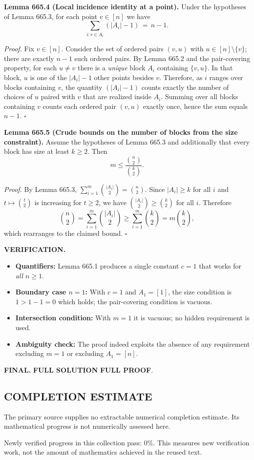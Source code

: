 \medskip
\noindent\textbf{Lemma 665.4 (Local incidence identity at a point).}
Under the hypotheses of Lemma 665.3, for each point $v\in[n]$ we have
\[
\sum_{i: v\in A_i} (|A_i|-1) \,=\, n-1.
\]

\noindent\emph{Proof.}
Fix $v\in[n]$.
Consider the set of ordered pairs $(v,u)$ with $u\in[n]\setminus\{v\}$; there are exactly $n-1$ such ordered pairs.
By Lemma 665.2 and the pair-covering property, for each $u\ne v$ there is a \emph{unique} block $A_i$ containing $\{v,u\}$.
In that block, $u$ is one of the $|A_i|-1$ other points besides $v$.
Therefore, as $i$ ranges over blocks containing $v$, the quantity $(|A_i|-1)$ counts exactly the number of choices of $u$ paired with $v$ that are realized inside $A_i$.
Summing over all blocks containing $v$ counts each ordered pair $(v,u)$ exactly once, hence the sum equals $n-1$.
\hfill$\square$

\medskip
\noindent\textbf{Lemma 665.5 (Crude bounds on the number of blocks from the size constraint).}
Assume the hypotheses of Lemma 665.3 and additionally that every block has size at least $k\ge 2$.
Then
\[
 m \le \frac{\binom n2}{\binom k2}.
\]

\noindent\emph{Proof.}
By Lemma 665.3, $\sum_{i=1}^m \binom{|A_i|}{2} = \binom n2$.
Since $|A_i|\ge k$ for all $i$ and $t\mapsto \binom t2$ is increasing for $t\ge 2$, we have $\binom{|A_i|}{2}\ge \binom k2$ for all $i$.
Therefore
\[
\binom n2 
= \sum_{i=1}^m \binom{|A_i|}{2}
\ge \sum_{i=1}^m \binom k2
= m\binom k2,
\]
which rearranges to the claimed bound.
\hfill$\square$

\bigskip
\noindent\textbf{VERIFICATION.}
\begin{itemize}
\item \textbf{Quantifiers:} Lemma 665.1 produces a single constant $c=1$ that works for \emph{all} $n\ge 1$.
\item \textbf{Boundary case $n=1$:} With $c=1$ and $A_1=[1]$, the size condition is $1>1-1=0$ which holds; the pair-covering condition is vacuous.
\item \textbf{Intersection condition:} With $m=1$ it is vacuous; no hidden requirement is used.
\item \textbf{Ambiguity check:} The proof indeed exploits the absence of any requirement excluding $m=1$ or excluding $A_1=[n]$.
\end{itemize}

\bigskip
\noindent\textbf{FINAL.} \textbf{FULL SOLUTION} \textbf{FULL PROOF}.




\subsection*{COMPLETION ESTIMATE}
The primary source supplies no extractable numerical completion estimate. Its mathematical progress is not numerically assessed here.

Newly verified progress in this collection pass: $0\%$. This measures new verification work, not the amount of mathematics achieved in the reused text.
